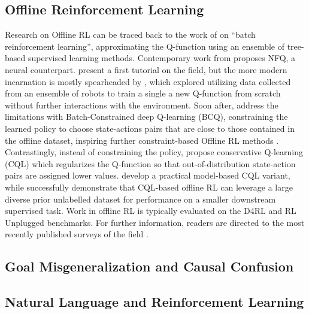\documentclass[../thesis-proposal/main.tex]{subfiles}
\begin{document}
\subsection{Offline Reinforcement Learning}

Research on Offline RL can be traced back to the work of \citet{ernst_tree-based_2005} on ``batch
reinforcement learning'', approximating the Q-function using an ensemble of tree-based supervised
learning methods. Contemporary work from \citet{riedmiller_neural_2005} proposes NFQ, a neural
counterpart.  present a first tutorial on the field, but the more modern
incarnation is mostly spearheaded by \citet{kalashnikov_scalable_2018}, which explored utilizing
data collected from an ensemble of robots to train a single a new Q-function from scratch without
further interactions with the environment. Soon after, \citet{fujimoto_off-policy_2019} address the
limitations with Batch-Constrained deep Q-learning (BCQ), constraining the learned policy to choose
state-actions pairs that are close to those contained in the offline dataset, inspiring further
constraint-based Offline RL methods \citep{kumar_stabilizing_2019, xu_offline_2021}. Contrastingly,
instead of constraining the policy, \citet{kumar_conservative_2020} propose conservative Q-learning
(CQL) which regularizes the Q-function so that out-of-distribution state-action pairs are assigned
lower values.  develop a practical model-based CQL variant, while
\citet{singh_cog_2020} successfully demonstrate that CQL-based offline RL can leverage a large
diverse prior unlabelled dataset for performance on a smaller downstream supervised task. Work in
offline RL is typically evaluated on the D4RL \citep{fu_d4rl_2021} and RL Unplugged
\citep{gulcehre_rl_2020} benchmarks. For further information, readers are directed to the most
recently published surveys of the field \citep{levine_offline_2020, prudencio_survey_2022}.

\subsection{Goal Misgeneralization and Causal Confusion} 

\subsection{Natural Language and Reinforcement Learning} 


\ifSubfilesClassLoaded{%
  
}{}
\end{document}
